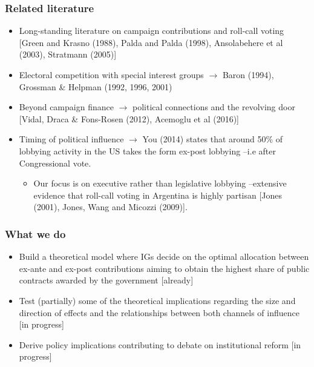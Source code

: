 \documentclass[handout,final,xcolor=dvipsnames]{beamer}
\begin{document}
\begin{frame}\frametitle{Related literature}
  \begin{itemize}\itemsep 10pt
     \item Long-standing literature on campaign contributions and
       roll-call voting [Green and Krasno (1988), Palda and Palda (1998), Ansolabehere et al
  (2003), Stratmann (2005)]
        \item Electoral competition with special interest groups
  $\longrightarrow$ Baron (1994), Grossman \& Helpman (1992, 1996,
  2001)
\item Beyond campaign finance $\longrightarrow$ political connections
  and the revolving door [Vidal, Draca \& Fons-Rosen (2012), Acemoglu et al (2016)]
\item Timing of political influence  $\longrightarrow$ You (2014) states that around 50\% of lobbying activity
  in the US takes the form ex-post lobbying --i.e after Congressional
  vote.
  \begin{itemize}
  \item Our focus is on executive rather than legislative lobbying
    --extensive evidence that roll-call voting in Argentina is highly partisan
    [Jones (2001), Jones, Wang and Micozzi (2009)]. 
    \end{itemize}
    \end{itemize}
  \end{frame}



  \begin{frame}\frametitle{What we do}
  \begin{itemize}\itemsep 10pt
  \item Build a theoretical model where IGs decide on the optimal
    allocation between ex-ante and ex-post contributions aiming to
    obtain the highest share of public contracts awarded by the
    government [already]
    \item Test (partially) some of the theoretical implications
      regarding the size and direction of effects and the
      relationships between both channels of influence [in progress]
      \item Derive policy implications contributing to debate on
        institutional reform [in progress]
    \end{itemize}
  \end{frame}
\end{document}
